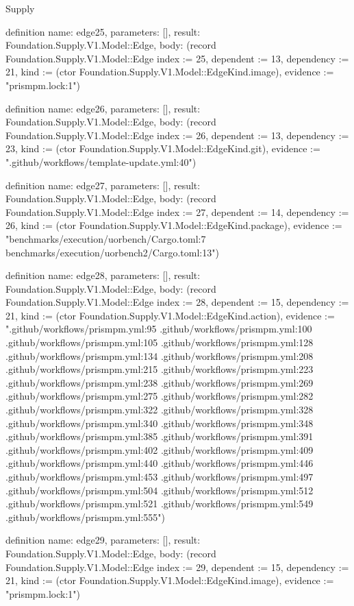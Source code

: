 \begin{lexlean}{Supply}
\begin{semanticmodule}
definition{
  name: edge25,
  parameters: [],
  result: Foundation.Supply.V1.Model::Edge,
  body: (record Foundation.Supply.V1.Model::Edge {index := 25, dependent := 13, dependency := 21, kind := (ctor Foundation.Supply.V1.Model::EdgeKind.image), evidence := "prismpm.lock:1"})
}

definition{
  name: edge26,
  parameters: [],
  result: Foundation.Supply.V1.Model::Edge,
  body: (record Foundation.Supply.V1.Model::Edge {index := 26, dependent := 13, dependency := 23, kind := (ctor Foundation.Supply.V1.Model::EdgeKind.git), evidence := ".github/workflows/template-update.yml:40"})
}

definition{
  name: edge27,
  parameters: [],
  result: Foundation.Supply.V1.Model::Edge,
  body: (record Foundation.Supply.V1.Model::Edge {index := 27, dependent := 14, dependency := 26, kind := (ctor Foundation.Supply.V1.Model::EdgeKind.package), evidence := "benchmarks/execution/uorbench/Cargo.toml:7 benchmarks/execution/uorbench2/Cargo.toml:13"})
}

definition{
  name: edge28,
  parameters: [],
  result: Foundation.Supply.V1.Model::Edge,
  body: (record Foundation.Supply.V1.Model::Edge {index := 28, dependent := 15, dependency := 21, kind := (ctor Foundation.Supply.V1.Model::EdgeKind.action), evidence := ".github/workflows/prismpm.yml:95 .github/workflows/prismpm.yml:100 .github/workflows/prismpm.yml:105 .github/workflows/prismpm.yml:128 .github/workflows/prismpm.yml:134 .github/workflows/prismpm.yml:208 .github/workflows/prismpm.yml:215 .github/workflows/prismpm.yml:223 .github/workflows/prismpm.yml:238 .github/workflows/prismpm.yml:269 .github/workflows/prismpm.yml:275 .github/workflows/prismpm.yml:282 .github/workflows/prismpm.yml:322 .github/workflows/prismpm.yml:328 .github/workflows/prismpm.yml:340 .github/workflows/prismpm.yml:348 .github/workflows/prismpm.yml:385 .github/workflows/prismpm.yml:391 .github/workflows/prismpm.yml:402 .github/workflows/prismpm.yml:409 .github/workflows/prismpm.yml:440 .github/workflows/prismpm.yml:446 .github/workflows/prismpm.yml:453 .github/workflows/prismpm.yml:497 .github/workflows/prismpm.yml:504 .github/workflows/prismpm.yml:512 .github/workflows/prismpm.yml:521 .github/workflows/prismpm.yml:549 .github/workflows/prismpm.yml:555"})
}

definition{
  name: edge29,
  parameters: [],
  result: Foundation.Supply.V1.Model::Edge,
  body: (record Foundation.Supply.V1.Model::Edge {index := 29, dependent := 15, dependency := 21, kind := (ctor Foundation.Supply.V1.Model::EdgeKind.image), evidence := "prismpm.lock:1"})
}


\end{semanticmodule}
\end{lexlean}
